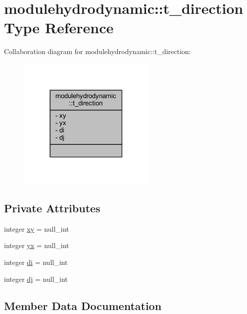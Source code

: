 \hypertarget{structmodulehydrodynamic_1_1t__direction}{}\section{modulehydrodynamic\+:\+:t\+\_\+direction Type Reference}
\label{structmodulehydrodynamic_1_1t__direction}


Collaboration diagram for modulehydrodynamic\+:\+:t\+\_\+direction\+:\nopagebreak
\begin{figure}[H]
\begin{center}
\leavevmode
\includegraphics[width=189pt]{structmodulehydrodynamic_1_1t__direction__coll__graph}
\end{center}
\end{figure}
\subsection*{Private Attributes}
\begin{DoxyCompactItemize}
\item 
integer \mbox{\hyperlink{structmodulehydrodynamic_1_1t__direction_ac150af77d341bd18ff020d091e7c3262}{xy}} = null\+\_\+int
\item 
integer \mbox{\hyperlink{structmodulehydrodynamic_1_1t__direction_ad482983257a2615eabc591cb33d2d184}{yx}} = null\+\_\+int
\item 
integer \mbox{\hyperlink{structmodulehydrodynamic_1_1t__direction_a0d1f2ebae107c1e98e828bb5f76da33b}{di}} = null\+\_\+int
\item 
integer \mbox{\hyperlink{structmodulehydrodynamic_1_1t__direction_aeece538c9f9fa6f14d58e9b0e3c13f02}{dj}} = null\+\_\+int
\end{DoxyCompactItemize}


\subsection{Member Data Documentation}
\mbox{\label{structmodulehydrodynamic_1_1t__direction_a0d1f2ebae107c1e98e828bb5f76da33b}} 
